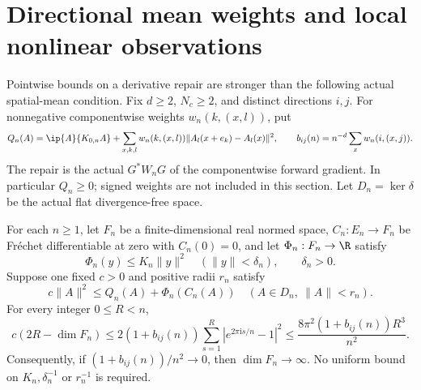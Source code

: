 \section{Directional mean weights and local nonlinear observations}\label{sec:average}
Pointwise bounds on a derivative repair are stronger than the following
actual spatial-mean condition. Fix $d\geq2$, $N_c\geq2$, and distinct
directions $i,j$. For nonnegative componentwise weights $w_n(k,(x,l))$, put
\[
 Q_n(A)=\ip{A}{K_{0,n}A}+\sum_{x,k,l}w_n(k,(x,l))
                  \|A_l(x+e_k)-A_l(x)\|^2,
 \qquad b_{ij}(n)=n^{-d}\sum_x w_n(i,(x,j)).
\]
The repair is the actual $G^*W_nG$ of the componentwise forward gradient.
In particular $Q_n\geq0$; signed weights are not included in this section.
Let $D_n=\ker\delta$ be the actual flat divergence-free space.

\begin{theorem}\label{thm:average}
For each $n\geq1$, let $F_n$ be a finite-dimensional real normed space,
$C_n:E_n\to F_n$ be Fr\'echet differentiable at zero with $C_n(0)=0$,
and let $\Phi_n:F_n\to\R$ satisfy
\[
 \Phi_n(y)\leq K_n\|y\|^2\quad(\|y\|<\delta_n),\qquad \delta_n>0.
\]
Suppose one fixed $c>0$ and positive radii $r_n$ satisfy
\begin{equation}\label{eq:local-average}
 c\|A\|^2\leq Q_n(A)+\Phi_n(C_n(A))
       \quad(A\in D_n,\ \|A\|<r_n).
\end{equation}
For every integer $0\leq R<n$,
\begin{equation}\label{eq:mean-finite}
 c(2R-\dim F_n)\leq 2(1+b_{ij}(n))
       \sum_{s=1}^{R}|e^{2\pi\mathrm{i}s/n}-1|^2
 \leq \frac{8\pi^2(1+b_{ij}(n))R^3}{n^2}.
\end{equation}
Consequently, if $(1+b_{ij}(n))/n^2\to0$, then $\dim F_n\to\infty$.
No uniform bound on $K_n,\delta_n^{-1}$ or $r_n^{-1}$ is required.
\end{theorem}
